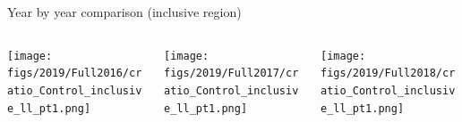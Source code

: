 \documentclass[9pt]{beamer}
\begin{document}
\begin{frame}{Year by year comparison (inclusive region)}
\justifying
\begin{columns}
		\hspace{5pt}
		\begin{column}{0.32\textwidth}
			\begin{center}
				\begin{block}{}\end{block}	
     			\texttt{[image: figs/2019/Full2016/cratio\_Control\_inclusive\_ll\_pt1.png]}
    		\end{center}		
		\end{column} \hfill
		\begin{column}{0.32\textwidth}
			\begin{center}
				\begin{block}{}\end{block}	
     			\texttt{[image: figs/2019/Full2017/cratio\_Control\_inclusive\_ll\_pt1.png]}
    		\end{center}		
		\end{column} \hfill
		\begin{column}{0.32\textwidth}
			\begin{center}
				\begin{block}{}\end{block}	
     			\texttt{[image: figs/2019/Full2018/cratio\_Control\_inclusive\_ll\_pt1.png]}
   			 \end{center}
		\end{column} \hfill
	\end{columns} \vspace{-5pt}
	\begin{columns}
		\hspace{5pt}

\end{columns}
\end{frame}
\end{document}
